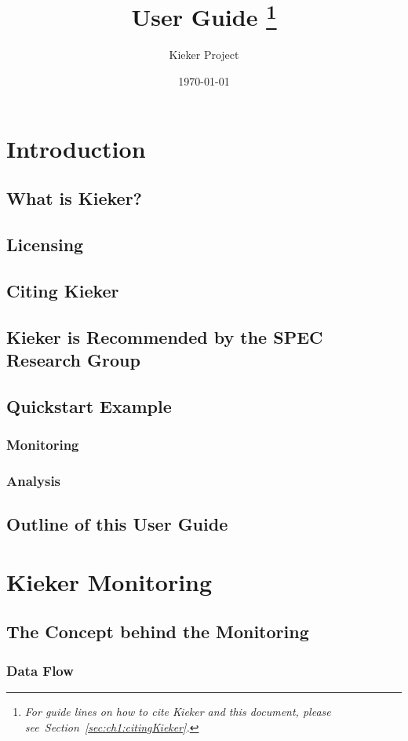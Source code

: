 \documentclass[paper=a4,twoside=false,fontsize=11pt,numbers=noenddot,version=first,bibliography=totoc,headsepline]{scrbook}
\title{%
\Huge\Kieker{} \version{} User Guide%
\footnote{\sffamily \textit{For guide lines on how to cite Kieker and this document, please see~Section~\ref{sec:ch1:citingKieker}.}}
}
\author{\sffamily Kieker Project%
}
\date{\sffamily\today}
\begin{document}
  \maketitle
  \setcounter{tocdepth}{1} %
  {\sffamily\tableofcontents}

	\chapter{Introduction}\label{chp:Introduction}
		\section{What is Kieker?}
		\section{Licensing}
		\section{Citing Kieker}
		\section{Kieker is Recommended by the SPEC Research Group}
		\section{Quickstart Example}
			\subsection{Monitoring}
			\subsection{Analysis}
		\section{Outline of this User Guide}

	\chapter{Kieker Monitoring}\label{chp:Monitoring}
		\section{The Concept behind the Monitoring}
			\subsection{Data Flow}
\end{document}
